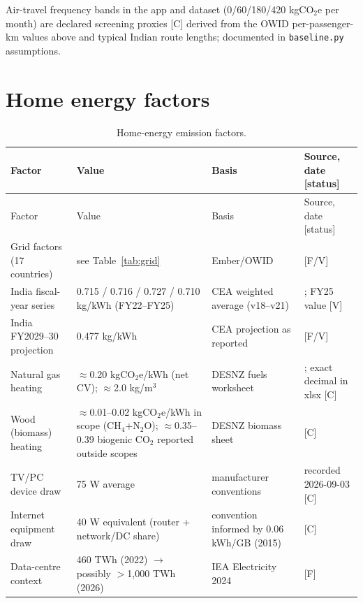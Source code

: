 \documentclass[11pt,a4paper]{article}
\begin{document}
\noindent Air-travel frequency bands in the app and dataset
(0/60/180/420 kgCO$_2$e per month) are declared screening proxies [C]
derived from the OWID per-passenger-km values above and typical Indian
route lengths; documented in \texttt{baseline.py} assumptions.

\section{Home energy factors}
\label{sec:home}

\begin{longtable}{@{}p{4.6cm}p{3.2cm}p{4.8cm}p{3.6cm}@{}}
\caption{Home-energy emission factors.}\label{tab:home}\\
\toprule
Factor & Value & Basis & Source, date [status] \\
\midrule
\endfirsthead
\toprule
Factor & Value & Basis & Source, date [status] \\
\midrule
\endhead
Grid factors (17 countries) & see Table~\ref{tab:grid} & Ember/OWID & \cite{ember_grid} [F/V] \\
India fiscal-year series & 0.715 / 0.716 / 0.727 / 0.710 kg/kWh (FY22--FY25) & CEA weighted average (v18--v21) & \cite{cea_baseline, wiki_india_electricity}; FY25 value [V] \\
India FY2029--30 projection & 0.477 kg/kWh & CEA projection as reported & \cite{wiki_india_electricity} [F/V] \\
Natural gas heating & $\approx$0.20 kgCO$_2$e/kWh (net CV); $\approx$2.0 kg/m$^3$ & DESNZ fuels worksheet & \cite{desnz2025}; exact decimal in xlsx [C] \\
Wood (biomass) heating & $\approx$0.01--0.02 kgCO$_2$e/kWh in scope (CH$_4$+N$_2$O); $\approx$0.35--0.39 biogenic CO$_2$ reported outside scopes & DESNZ biomass sheet & \cite{desnz2025} [C] \\
TV/PC device draw & 75 W average & manufacturer conventions & recorded 2026-09-03 [C] \\
Internet equipment draw & 40 W equivalent (router + network/DC share) & convention informed by 0.06 kWh/GB (2015) & \cite{aslan2018} [C] \\
Data-centre context & 460 TWh (2022) $\rightarrow$ possibly $>$1{,}000 TWh (2026) & IEA Electricity 2024 & \cite{iea_electricity2024} [F] \\
\bottomrule
\end{longtable}

\end{document}
